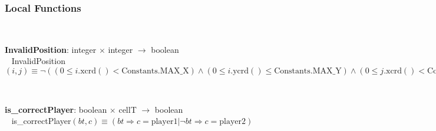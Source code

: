 \documentclass[12pt]{article}
\begin{document}
\subsubsection* {Local Functions}



~\newline


\noindent \textbf{InvalidPosition}: integer $\times$ integer $\rightarrow$ boolean\\
~\newline
InvalidPosition$(i, j) \equiv \neg ( ( 0 \leq i.\mbox{xcrd}()  < \mbox{Constants.MAX\_X} ) \wedge ( 0 \leq i.\mbox{ycrd}() \leq \mbox{Constants.MAX\_Y})
\wedge ( 0 \leq j.\mbox{xcrd}()  < \mbox{Constants.MAX\_X} ) \wedge ( 0 \leq j.\mbox{ycrd}() \leq \mbox{Constants.MAX\_Y}))$

~\newline

\noindent \textbf{is\_correctPlayer}: boolean $\times$ cellT $\rightarrow$ boolean\\
~\newline
is\_correctPlayer$(bt, c) \equiv ( \mathit{bt} \Rightarrow c = \mbox{player1} | \neg \mathit{bt} \Rightarrow c = \mbox{player2}
)$
~\newline
\end{document}
